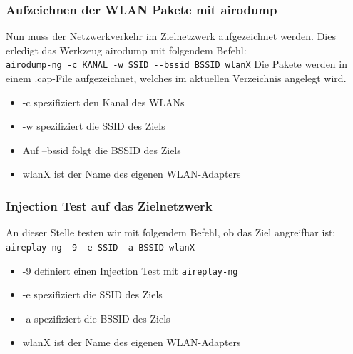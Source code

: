 	\subsubsection{Aufzeichnen der WLAN Pakete mit airodump}
	Nun muss der Netzwerkverkehr im Zielnetzwerk aufgezeichnet werden. Dies erledigt das
	Werkzeug airodump mit folgendem Befehl: \\
	\colorbox{altgray}{\lstinline|airodump-ng -c KANAL -w SSID --bssid BSSID wlanX|}
	Die Pakete werden in einem .cap-File aufgezeichnet, welches im aktuellen Verzeichnis angelegt wird.
	\begin{itemize}
		\item -c spezifiziert den Kanal des WLANs
		\item -w spezifiziert die SSID des Ziels
		\item Auf --bssid folgt die BSSID des Ziels
		\item wlanX ist der Name des eigenen WLAN-Adapters
	\end{itemize}
	\subsubsection{Injection Test auf das Zielnetzwerk}
	An dieser Stelle testen wir mit folgendem Befehl, ob das Ziel angreifbar ist: \colorbox{altgray}{\lstinline|aireplay-ng -9 -e SSID -a BSSID wlanX|}
		\begin{itemize}
			\item -9 definiert einen Injection Test mit \colorbox{altgray}{\lstinline|aireplay-ng|}
			\item -e spezifiziert die SSID des Ziels
			\item -a spezifiziert die BSSID des Ziels
			\item wlanX ist der Name des eigenen WLAN-Adapters
		\end{itemize}

